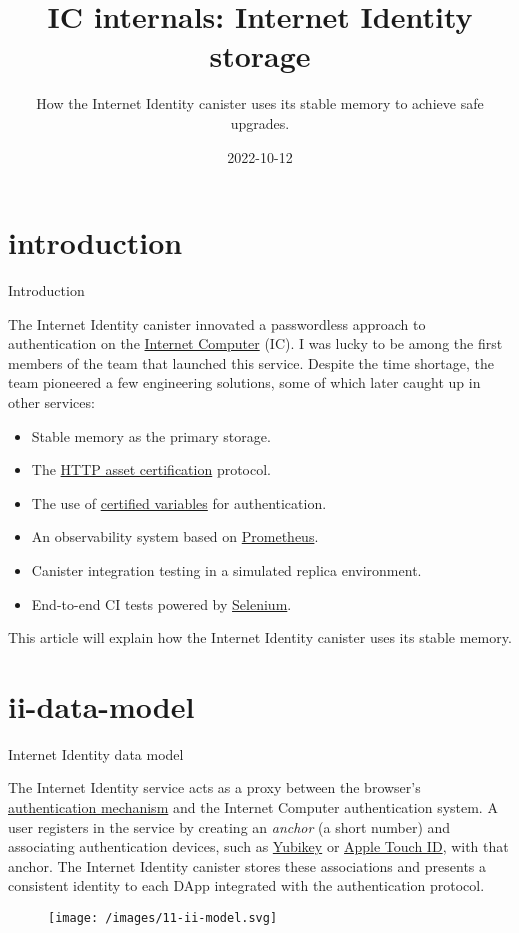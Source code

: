\documentclass{article}
\title{IC internals: Internet Identity storage}
\subtitle{How the Internet Identity canister uses its stable memory to achieve safe upgrades.}
\date{2022-10-12}
\begin{document}
\section{introduction}{Introduction}

The Internet Identity canister innovated a passwordless approach to authentication on the \href{https://internetcomputer.org}{Internet Computer} (IC).
I was lucky to be among the first members of the team that launched this service.
Despite the time shortage, the team pioneered a few engineering solutions, some of which later caught up in other services:
\begin{itemize}
  \item Stable memory as the primary storage.
  \item The \href{https://wiki.internetcomputer.org/wiki/HTTP_asset_certification}{HTTP asset certification} protocol.
  \item The use of \href{https://internetcomputer.org/how-it-works/response-certification/}{certified variables} for authentication.
  \item An observability system based on \href{https://prometheus.io/docs/introduction/overview/}{Prometheus}.
  \item Canister integration testing in a simulated replica environment.
  \item End-to-end CI tests powered by \href{https://www.selenium.dev/}{Selenium}.
\end{itemize}

This article will explain how the Internet Identity canister uses its stable memory.

\section{ii-data-model}{Internet Identity data model}

The Internet Identity service acts as a proxy between the browser's \href{https://webauthn.io/}{authentication mechanism} and the Internet Computer authentication system.
A user registers in the service by creating an \emph{anchor} (a short number) and associating authentication devices, such as \href{https://en.wikipedia.org/wiki/YubiKey}{Yubikey} or \href{https://en.wikipedia.org/wiki/Touch_ID}{Apple Touch ID}, with that anchor.
The Internet Identity canister stores these associations and presents a consistent identity to each DApp integrated with the authentication protocol.

\begin{figure}[grayscale-diagram]
  \texttt{[image: /images/11-ii-model.svg]}
\end{figure}
\end{document}
